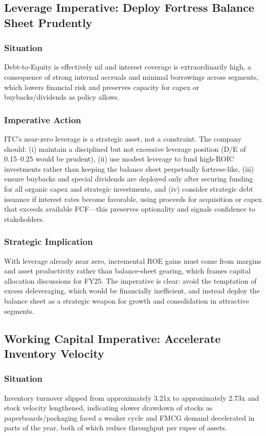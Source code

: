 \documentclass[12pt, a4paper]{report}
\begin{document}
\subsection{Leverage Imperative: Deploy Fortress Balance Sheet Prudently}

\subsubsection{Situation}
Debt-to-Equity is effectively nil and interest coverage is extraordinarily high, a consequence of strong internal accruals and minimal borrowings across segments, which lowers financial risk and preserves capacity for capex or buybacks/dividends as policy allows.

\subsubsection{Imperative Action}
ITC's near-zero leverage is a strategic asset, not a constraint. The company should: (i) maintain a disciplined but not excessive leverage position (D/E of 0.15–0.25 would be prudent), (ii) use modest leverage to fund high-ROIC investments rather than keeping the balance sheet perpetually fortress-like, (iii) ensure buybacks and special dividends are deployed only after securing funding for all organic capex and strategic investments, and (iv) consider strategic debt issuance if interest rates become favorable, using proceeds for acquisition or capex that exceeds available FCF—this preserves optionality and signals confidence to stakeholders.

\subsubsection{Strategic Implication}
With leverage already near zero, incremental ROE gains must come from margins and asset productivity rather than balance-sheet gearing, which frames capital allocation discussions for FY25. The imperative is clear: avoid the temptation of excess deleveraging, which would be financially inefficient, and instead deploy the balance sheet as a strategic weapon for growth and consolidation in attractive segments.

\subsection{Working Capital Imperative: Accelerate Inventory Velocity}

\subsubsection{Situation}
Inventory turnover slipped from approximately 3.21x to approximately 2.73x and stock velocity lengthened, indicating slower drawdown of stocks as paperboards/packaging faced a weaker cycle and FMCG demand decelerated in parts of the year, both of which reduce throughput per rupee of assets.
\end{document}
